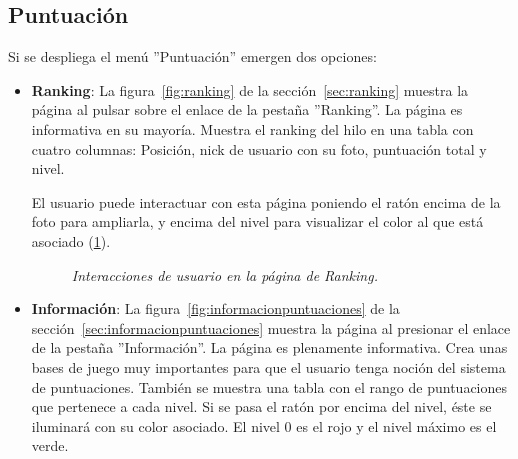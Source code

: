 \documentclass[a4paper, 12pt]{book}
\begin{document}
\subsection{Puntuaci\'on}
Si se despliega el men\'u ''Puntuaci\'on'' emergen dos opciones:
\begin{itemize}
  \item {\bfseries Ranking}: La figura~\ref{fig:ranking} de la secci\'on~\ref{sec:ranking} muestra la p\'agina al pulsar sobre el enlace de la pesta\~na 
  ''Ranking''. La p\'agina es informativa en su mayor\'ia. Muestra el ranking del hilo en una tabla con cuatro columnas: Posici\'on, nick de usuario con su
  foto, puntuaci\'on total y nivel.
  
  El usuario puede interactuar con esta p\'agina poniendo el rat\'on encima de la foto para ampliarla, y encima del nivel para visualizar el color al que 
  est\'a asociado (\ref{figura:ranking}).
  \begin{figure}
    \centering
    \caption{\textit{Interacciones de usuario en la p\'agina de Ranking.}}
    \label{figura:ranking}
  \end{figure}
  \item {\bfseries Informaci\'on}: La figura~\ref{fig:informacionpuntuaciones} de la secci\'on~\ref{sec:informacionpuntuaciones} muestra la p\'agina al 
  presionar el enlace de la pesta\~na ''Informaci\'on''. La p\'agina es plenamente informativa. Crea unas bases de juego muy importantes para que el usuario
  tenga noci\'on del sistema de puntuaciones. Tambi\'en se muestra una tabla con el rango de puntuaciones que pertenece a cada nivel. Si se pasa el rat\'on
  por encima del nivel, \'este se iluminar\'a con su color asociado. El nivel 0 es el rojo y el nivel m\'aximo es el verde.
\end{itemize}
\end{document}
